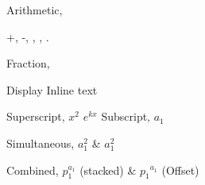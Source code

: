 \documentclass[10pt]{article}
\begin{document}
    Arithmetic,

    +, -, \cdot, \times, \div.

    Fraction,


     Display
     Inline text

    Superscript, \(x^2\) \cdot \(e^{kx}\)
    Subscript, \(a_1\)

    Simultaneous, \(a_1^2\) & \(a^2_1\)

    Combined, \(p_1^{a_1}\) (stacked) & \({p_1}^{a_1}\) (Offset)
    
\end{document}
